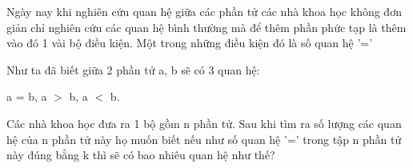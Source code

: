 Ngày nay khi nghiên cứu quan hệ giữa các phần tử các nhà khoa học không đơn giản chỉ nghiên cứu các quan hệ bình thường mà để thêm phần phức tạp là thêm vào đó 1 vài bộ điều kiện. Một trong những điều kiện đó là số quan hệ '='  

   Như ta đã biết giữa 2 phần tử a, b sẽ có 3 quan hệ:  

   a = b, a $>$ b, a $<$ b.  

   Các nhà khoa học đưa ra 1 bộ gồm n phần tử. Sau khi tìm ra số lượng các quan hệ của n phần tử này họ muốn biết nếu như số quan hệ '=' trong tập n phần tử này đúng bằng k thì sẽ có bao nhiêu quan hệ như thế?  

\
